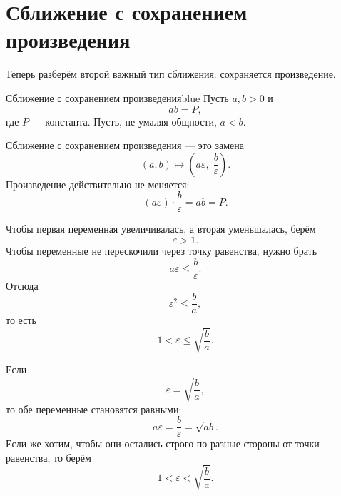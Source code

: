 \newpage

\chapter{Сближение с сохранением произведения}

Теперь разберём второй важный тип сближения: сохраняется произведение.

\begin{taskbox}{Сближение с сохранением произведения}{blue}{}
Пусть $a,b>0$ и
\[
    ab=P,
\]
где $P$ --- константа. Пусть, не умаляя общности, $a<b$.

Сближение с сохранением произведения --- это замена
\[
    (a,b)\longmapsto \left(a\varepsilon,\; \frac{b}{\varepsilon}\right).
\]
Произведение действительно не меняется:
\[
    (a\varepsilon)\cdot \frac{b}{\varepsilon}=ab=P.
\]

Чтобы первая переменная увеличивалась, а вторая уменьшалась, берём
\[
    \varepsilon>1.
\]
Чтобы переменные не перескочили через точку равенства, нужно брать
\[
    a\varepsilon\le \frac{b}{\varepsilon}.
\]
Отсюда
\[
    \varepsilon^2\le \frac ba,
\]
то есть
\[
    1<\varepsilon\le \sqrt{\frac ba}.
\]

Если
\[
    \varepsilon=\sqrt{\frac ba},
\]
то обе переменные становятся равными:
\[
    a\varepsilon=\frac b\varepsilon=\sqrt{ab}.
\]
Если же хотим, чтобы они остались строго по разные стороны от точки равенства, то берём
\[
    1<\varepsilon<\sqrt{\frac ba}.
\]
\end{taskbox}

